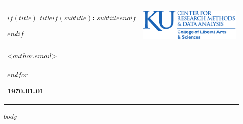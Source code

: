 \documentclass[$if(fontsize)$$fontsize$$endif$,english,letterpaper]{scrartcl}
\providecommand{\tabularnewline}{\\}
\begin{document}

\begin{minipage}[t]{1\columnwidth}%
\begin{center}
\begin{tabular}[t]{>{\raggedright}p{4in}>{\centering}p{2.25in}}
\hline 
\medskip{}

$if(title)$
\textsc{\Large{}$title$$if(subtitle)$: $subtitle$$endif$}{\Large \par}
$endif$

\medskip{}
  & \medskip{}


\includegraphics[width=2in]{theme/CRMDA_logo}\tabularnewline
\hline

\multicolumn{2}{>{\raggedright}p{5in}}{\medskip{}
$for(author)$$author.name$,
  $author.description$, $author.affiliation$ \\ <$author.email$> \\
$endfor$


\begin{singlespace}
\raggedright{}\textbf{\today}
\end{singlespace}
}\tabularnewline
\hline 
\end{tabular}
\par\end{center}
\medskip{}

\end{minipage}

$body$
\end{document}
